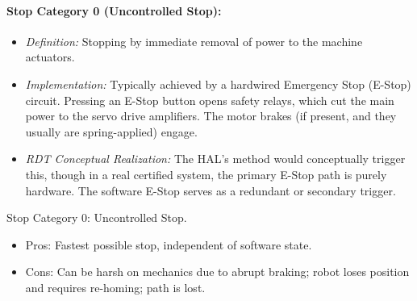 \paragraph{Stop Category 0 (Uncontrolled Stop):}
        \begin{itemize}
            \item \textit{Definition:} Stopping by immediate removal of power to the machine actuators.
            \item \textit{Implementation:} Typically achieved by a hardwired Emergency Stop (E-Stop) circuit. Pressing an E-Stop button opens safety relays, which cut the main power to the servo drive amplifiers. The motor brakes (if present, and they usually are spring-applied) engage.
            \item \textit{RDT Conceptual Realization:} The HAL's  method would conceptually trigger this, though in a real certified system, the primary E-Stop path is purely hardware. The software E-Stop serves as a redundant or secondary trigger.
        \end{itemize}
        \begin{tipbox}{Stop Category 0: Uncontrolled Stop.}
            \begin{itemize}
                 \item Pros: Fastest possible stop, independent of software state.
                \item Cons: Can be harsh on mechanics due to abrupt braking; robot loses position and requires re-homing; path is lost.
            \end{itemize}
        \end{tipbox}

